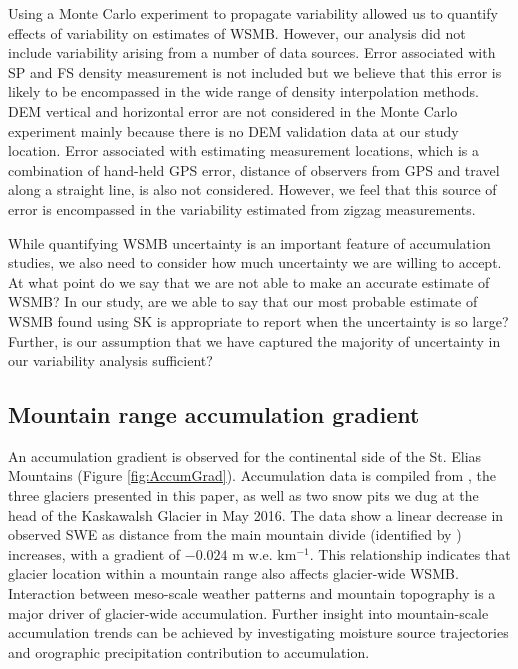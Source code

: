 \documentclass[review,oneside, letterpaper]{igs}
\begin{document}
Using a Monte Carlo experiment to propagate variability allowed us to quantify effects of variability on estimates of WSMB. However, our analysis did not include variability arising from a number of data sources. Error associated with SP and FS density measurement is not included but we believe that this error is likely to be encompassed in the wide range of density interpolation methods. DEM vertical and horizontal error are not considered in the Monte Carlo experiment mainly because there is no DEM validation data at our study location. Error associated with estimating measurement locations, which is a combination of hand-held GPS error, distance of observers from GPS and travel along a straight line, is also not considered. However, we feel that this source of error is encompassed in the variability estimated from zigzag measurements. 

While quantifying WSMB uncertainty is an important feature of accumulation studies, we also need to consider how much uncertainty we are willing to accept. At what point do we say that we are not able to make an accurate estimate of WSMB? In our study, are we able to say that our most probable estimate of WSMB found using SK is appropriate to report when the uncertainty is so large? Further, is our assumption that we have captured the majority of uncertainty in our variability analysis sufficient? 

\subsection{Mountain range accumulation gradient}

An accumulation gradient is observed for the continental side of the St. Elias Mountains (Figure \ref{fig:AccumGrad}). Accumulation data is compiled from \cite{Taylor1969}, the three glaciers presented in this paper, as well as two snow pits we dug at the head of the Kaskawalsh Glacier in May 2016. The data show a linear decrease in observed SWE as distance from the main mountain divide (identified by \cite{Taylor1969}) increases, with a gradient of $-0.024$ m w.e. km$^{-1}$. This relationship indicates that glacier location within a mountain range also affects glacier-wide WSMB. Interaction between meso-scale weather patterns and mountain topography is a major driver of glacier-wide accumulation. Further insight into mountain-scale accumulation trends can be achieved by investigating moisture source trajectories and orographic precipitation contribution to accumulation. 
\end{document}
